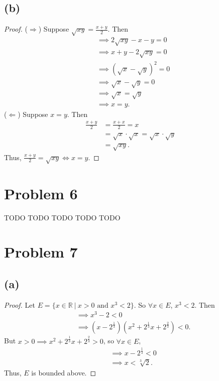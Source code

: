 \documentclass{article}
\begin{document}
\subsection*{(b)}
\begin{proof}
	($\Rightarrow$) Suppose $\sqrt{xy} = \frac{x+y}{2}$. Then
	\begin{align}
		&\implies 2\sqrt{xy} - x - y = 0 \\
		&\implies x + y - 2\sqrt{xy} = 0 \\
		&\implies \left(\sqrt{x} - \sqrt{y}\right)^2 = 0 \\
		&\implies \sqrt{x} - \sqrt{y} = 0 \\
		&\implies \sqrt{x} = \sqrt{y} \\
		&\implies x = y.
	\end{align}
	($\Leftarrow$) Suppose $x=y$. Then
	\begin{align}
		\frac{x+y}{2} &= \frac{x+x}{2} = x \\
		&= \sqrt{x}\cdot \sqrt{x} = \sqrt{x}\cdot \sqrt{y}\\
		&= \sqrt{xy}.
	\end{align}
	Thus, $\frac{x+y}{2}=\sqrt{xy} \iff x=y$.
\end{proof}

\section*{Problem 6}
TODO TODO TODO TODO TODO

\section*{Problem 7}
\subsection*{(a)}
\begin{proof}
	Let $E = \{x\in\mathbb{R} \: | \: x>0 \textrm{ and } x^3 < 2\}$. So $\forall x \in E$, $x^3 < 2$. Then
	\begin{align}
		&\implies x^3 - 2 < 0 \\
		&\implies \left(x-2^{\frac{1}{3}}\right)\left(x^2 + 2^{\frac{1}{3}}x + 2^{\frac{2}{3}}\right) < 0.
	\end{align}
	But $x>0 \implies x^2 + 2^{\frac{1}{3}}x + 2^{\frac{2}{3}} > 0$, so $\forall x \in E$, 
	\begin{align}
		&\implies x-2^{\frac{1}{3}} < 0 \\
		&\implies x < \sqrt[3]{2}.
	\end{align}
	Thus, $E$ is bounded above.
\end{proof}
\end{document}
